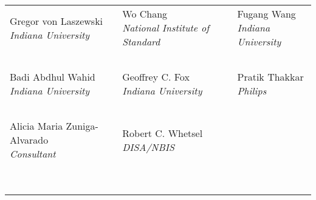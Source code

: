 \begin{center}
\parindent0pt 
\begin{tabular}{p{}p{}p{}}
 \makecell[l]{Gregor von Laszewski\\{\it Indiana University}} &
 \makecell[l]{Wo Chang\\{\it National Institute of Standard}} &
 \makecell[l]{Fugang Wang\\{\it Indiana University}}  \\
\multicolumn{3}{c}{~} \\
 \makecell[l]{Badi Abdhul Wahid\\{\it Indiana University}} & 
 \makecell[l]{Geoffrey C. Fox\\{\it Indiana University}} &
 \makecell[l]{Pratik Thakkar\\{\it Philips}} \\
\multicolumn{3}{c}{~} \\
 \makecell[l]{Alicia Maria Zuniga-Alvarado\\{\it Consultant}} &
 \makecell[l]{Robert C. Whetsel\\ {\it DISA/NBIS}} \\
 \makecell[l]{~\\~} \\
\end{tabular}
\end{center}

